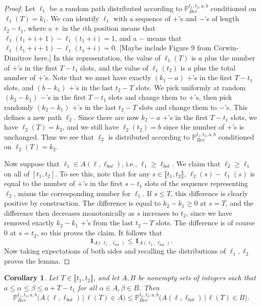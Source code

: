 \documentclass[12pt]{article}
\newtheorem{cor}{Corollary}
\begin{document}
	\begin{proof}
		Let $\ell_1$ be a random path distributed according to $\mathbb{P}^{t_1, t_2, a, b}_{Ber}$ conditioned on $\ell_1(T) = k_1$. We can identify $\ell_1$ with a sequence of $+$'s and $-$'s of length $t_2-t_1$, where a $+$ in the $i$th position means that $\ell_1(t_1+i+1)-\ell_1(t_1+i) = 1$, and a $-$ means that $\ell_1(t_1+i+1)-\ell_1(t_1+i) = 0$. [Maybe include Figure 9 from Corwin-Dimitrov here.] In this representation, the value of $\ell_1(T)$ is $a$ plus the number of $+$'s in the first $T-t_1$ slots, and the value of $\ell_1(t_2)$ is $a$ plus the total number of $+$'s. Note that we must have exactly $(k_1-a)$ $+$'s in the first $T-t_1$ slots, and $(b-k_1)$ $+$'s in the last $t_2-T$ slots. We pick uniformly at random $(k_2-k_1)$ $-$'s in the first $T-t_1$ slots and change them to $+$'s, then pick randomly $(k_2-k_1)$ $+$'s in the last $t_2-T$ slots and change them to $-$'s. This defines a new path $\ell_2$. Since there are now $k_2-a$ $+$'s in the first $T-t_1$ slots, we have $\ell_2(T) = k_2$, and we still have $\ell_2(t_2) = b$ since the number of $+$'s is unchanged. Thus we see that $\ell_2$ is distributed according to $\mathbb{P}^{t_1,t_2,a,b}_{Ber}$ conditioned on $\ell_2(T) = k_2$. 
		
		Now suppose that $\ell_1 \in A(\ell,\ell_{bot})$, i.e., $\ell_1 \geq \ell_{bot}$. We claim that $\ell_2 \geq \ell_1$ on all of $[t_1,t_2]$. To see this, note that for any $s\in\llbracket t_1, t_2\rrbracket$, $\ell_2(s) - \ell_1(s)$ is equal to the number of $+$'s in the first $s-t_1$ slots of the sequence representing $\ell_2$, minus the corresponding number for $\ell_1$. If $s\leq T$, this difference is clearly positive by construction. The difference is equal to $k_2 - k_1 \geq 0$ at $s = T$, and the difference then decreases monotonically as $s$ increases to $t_2$, since we have removed exactly $k_2-k_1$ $+$'s from the last $t_2-T$ slots. The difference is of course 0 at $s = t_2$, so this proves the claim. It follows that
		\[
		\mathbf{1}_{A(\ell_1,\ell_{bot})} \leq \mathbf{1}_{A(\ell_2,\ell_{bot})}.
		\]
		Now taking expectations of both sides and recalling the distributions of $\ell_1,\ell_2$ proves the lemma.
	\end{proof}


	\begin{cor}
		Let $T\in\llbracket t_1, t_2\rrbracket$, and let $A, B$ be nonempty sets of integers such that $a \leq \alpha \leq \beta \leq a+T-t_1$ for all $\alpha\in A, \beta\in B$. Then
		\[
		\mathbb{P}^{t_1, t_2, a, b}_{Ber}\big(A(\ell,\ell_{bot})\,\big|\,\ell(T) \in A\big) \leq \mathbb{P}^{t_1, t_2, a, b}_{Ber}\big(A(\ell,\ell_{bot})\,\big|\,\ell(T) \in B\big).
		\]
	\end{cor}
\end{document}
